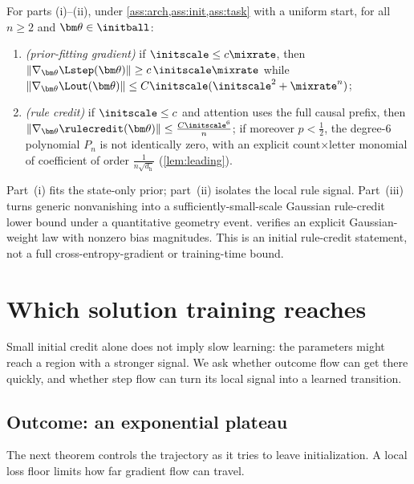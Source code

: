 \begin{theorem}
\label{thm:separation}
For parts (i)--(ii), under \cref{ass:arch,ass:init,ass:task} with a uniform start,
for all $n\ge2$ and $\bm\theta\in\initball$:
\begin{enumerate}[label=(\roman*),leftmargin=*,itemsep=0pt,topsep=2pt]
\item \emph{(prior-fitting gradient)} if $\initscale\le c\mixrate$, then $\|\nabla_{\bm\theta}\Lstep(\bm\theta)\|\ge c\,\initscale\mixrate$ while
$\|\nabla_{\bm\theta}\Lout(\bm\theta)\|\le C\initscale(\initscale^2+\mixrate^n)$;
\item \emph{(rule credit)} if $\initscale\le c$ and attention uses the full causal prefix, then $\|\nabla_{\bm\theta}\rulecredit(\bm\theta)\|\le \frac{C\initscale^6}{n}$; if
moreover $p<\tfrac{1}{2}$, the degree-$6$ polynomial $P_n$ is not identically zero, with an explicit count$\times$letter monomial of
coefficient of order $\frac{1}{n\sqrt{d_{\mathrm h}}}$
(\cref{lem:leading}).

\end{enumerate}
\end{theorem}

Part~(i) fits the state-only prior; part~(ii) isolates the local rule signal.
Part~(iii) turns generic nonvanishing into a sufficiently-small-scale Gaussian rule-credit
lower bound under a quantitative geometry event. 
verifies an explicit Gaussian-weight law with nonzero bias magnitudes. This is an initial
rule-credit statement, not a full cross-entropy-gradient or training-time bound.

\section{Which solution training reaches}
\label{sec:reach}

Small initial credit alone does not imply slow learning: the parameters might reach a region with a stronger signal. We ask
whether outcome flow can get there quickly, and whether step flow can turn its local signal into a learned transition.

\subsection{Outcome: an exponential plateau}

The next theorem controls the trajectory as it tries to leave initialization. A local loss floor limits how far gradient flow can travel.

